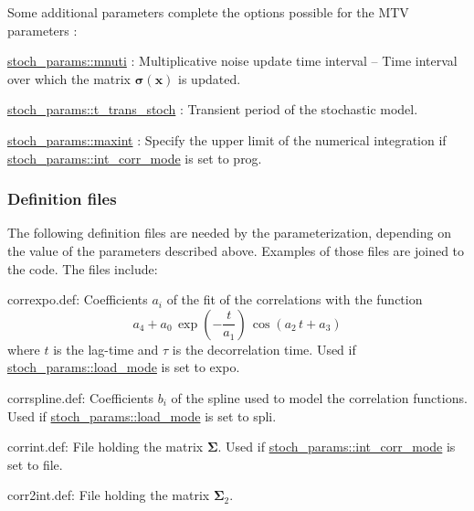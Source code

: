 Some additional parameters complete the options possible for the M\+TV parameters \+:
\begin{DoxyItemize}
\item \hyperlink{namespacestoch__params_ab0b8df90daf320dc4f5810eacd7d93e7}{stoch\+\_\+params\+::mnuti} \+: Multiplicative noise update time interval -- Time interval over which the matrix $\boldsymbol\sigma(\boldsymbol x)$ is updated.
\item \hyperlink{namespacestoch__params_a11aa6b888c2b4005aca690fb78e2c785}{stoch\+\_\+params\+::t\+\_\+trans\+\_\+stoch} \+: Transient period of the stochastic model.
\item \hyperlink{namespacestoch__params_a50976593e79387f25e08fef6ce56b30b}{stoch\+\_\+params\+::maxint} \+: Specify the upper limit of the numerical integration if \hyperlink{namespacestoch__params_ab901db3992a4df88db5a67fdd7be6ac6}{stoch\+\_\+params\+::int\+\_\+corr\+\_\+mode} is set to \textquotesingle{}prog\textquotesingle{}.
\end{DoxyItemize}

\subsubsection*{Definition files}

The following definition files are needed by the parameterization, depending on the value of the parameters described above. Examples of those files are joined to the code. The files include\+:
\begin{DoxyItemize}
\item \textquotesingle{}correxpo.\+def\textquotesingle{}\+: Coefficients $a_i$ of the fit of the correlations with the function \[ a_4+a_0 \, \exp\left(-\frac{t}{a_1}\right) \, \cos(a_2 \, t + a_3) \] where $t$ is the lag-\/time and $\tau$ is the decorrelation time. Used if \hyperlink{namespacestoch__params_ac61a48744a1bb015b5148c421837fbe7}{stoch\+\_\+params\+::load\+\_\+mode} is set to \textquotesingle{}expo\textquotesingle{}.
\item \textquotesingle{}corrspline.\+def\textquotesingle{}\+: Coefficients $b_i$ of the spline used to model the correlation functions. Used if \hyperlink{namespacestoch__params_ac61a48744a1bb015b5148c421837fbe7}{stoch\+\_\+params\+::load\+\_\+mode} is set to \textquotesingle{}spli\textquotesingle{}.
\item \textquotesingle{}corrint.\+def\textquotesingle{}\+: File holding the matrix $\boldsymbol\Sigma$. Used if \hyperlink{namespacestoch__params_ab901db3992a4df88db5a67fdd7be6ac6}{stoch\+\_\+params\+::int\+\_\+corr\+\_\+mode} is set to \textquotesingle{}file\textquotesingle{}.
\item \textquotesingle{}corr2int.\+def\textquotesingle{}\+: File holding the matrix $\boldsymbol\Sigma_2$. 


\end{DoxyItemize}

